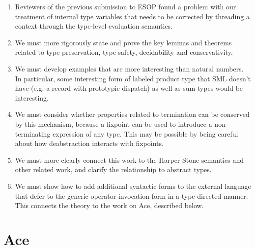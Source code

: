 \begin{enumerate}
\item Reviewers of the previous submission to ESOP found a problem with our treatment of internal type variables that needs to be corrected by threading a context through the type-level evaluation semantics.
\item We must more rigorously state and prove the key lemmas and theorems related to type preservation, type safety, decidability and conservativity. 
\item We must develop examples that are more interesting than natural numbers. In particular, some interesting form of labeled product type that SML doesn't have (e.g. a record with prototypic dispatch) as well as sum types would be interesting.
\item We must consider whether properties related to termination can be conserved by this mechanism, because a fixpoint can be used to introduce a non-terminating expression of any type. This may be possible by being careful about how deabstraction interacts with fixpoints.
\item We must more clearly connect this work to the Harper-Stone semantics and other related work, and clarify  the relationship to abstract types.
\item We must show how to add additional syntactic forms to the external language that defer to the generic operator invocation form in a type-directed manner. This connects the theory to the work on Ace, described below. 
\end{enumerate}

\section{Ace}\label{ace}




